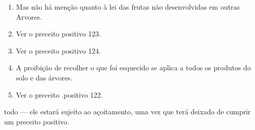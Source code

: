\begin{itemize}
\begin{enumrate}
\begin{itemize}
\begin{itemize}
\begin{itemize}
\begin{enumerate}
\def\labelenumi{\arabic{enumi}.}
\setcounter{enumi}{379}
\item
 
 Mas não há menção quanto à lei das frutas não desenvolvidas em outras
 Arvores.
 
\item
 
 Ver o preceito positivo 123.
 
\item
 
 Ver o preceito positivo 124.
 
\item
 
 A proibição de recolher o que foi esquecido se aplica a todos os
 produtos do solo e das árvores.
 
\item
 
 Ver o preceito .positivo 122.
 
\end{enumerate}

todo --- ele estará sujeito ao açoitamento, uma vez que terá deixado de
cumprir um preceito positivo.


\end{itemize}
\end{itemize}
\end{itemize}
\end{enumrate}
\end{itemize}
